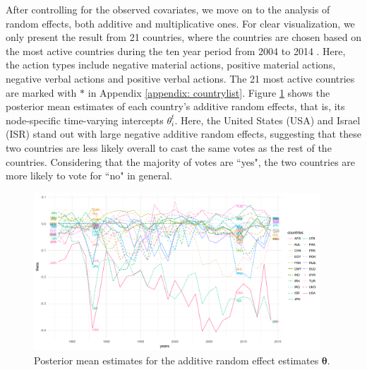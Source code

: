 \documentclass[a4paper]{article}
\begin{document}
 \newline\noindent After controlling for the observed covariates, we move on to the analysis of random effects, both additive and multiplicative ones. For clear visualization, we only present the result from 21 countries, where the countries are chosen based on the most active countries during the ten year period from 2004 to 2014 \citep{hoff2015multilinear}. Here, the action types include negative material actions, positive material actions, negative verbal actions and positive verbal actions. The 21 most active countries are marked with $*$ in Appendix \ref{appendix: countrylist}. Figure \ref{figure:thetaplot} shows the posterior mean estimates of each country's additive random effects, that is, its node-specific time-varying intercepts $\theta_i^t$. Here, the United States (USA) and Israel (ISR) stand out with large negative additive random effects, suggesting that these two countries are less likely overall to cast the same votes as the rest of the countries. Considering that the majority of votes are ``yes", the two countries are more likely to vote for ``no" in general. \begin{figure}[!t]
 	\begin{center}
 		\includegraphics[width=0.955\textwidth]{plots_paper/thetaplot-1.png}	
 	\end{center}
 	\caption {Posterior mean estimates for the additive random effect estimates $\boldsymbol{\theta}$.}
 	\label{figure:thetaplot}
 \end{figure}
 \\ \newline
\end{document}
